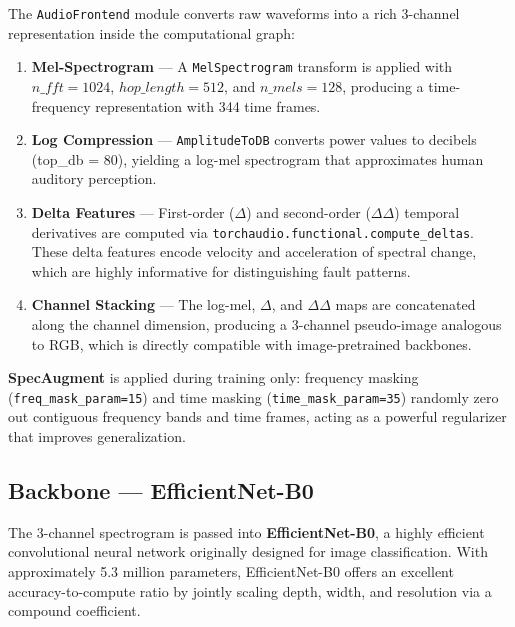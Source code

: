 \documentclass[12pt,a4paper]{article}
\begin{document}
The \texttt{AudioFrontend} module converts raw waveforms into a rich 3-channel representation inside the computational graph:

\begin{enumerate}[leftmargin=2em]
  \item \textbf{Mel-Spectrogram} — A \texttt{MelSpectrogram} transform is applied with $n\_fft = 1024$, $hop\_length = 512$, and $n\_mels = 128$, producing a time-frequency representation with 344 time frames.
  \item \textbf{Log Compression} — \texttt{AmplitudeToDB} converts power values to decibels (top\_db = 80), yielding a log-mel spectrogram that approximates human auditory perception.
  \item \textbf{Delta Features} — First-order ($\Delta$) and second-order ($\Delta\Delta$) temporal derivatives are computed via \texttt{torchaudio.functional.compute\_deltas}. These delta features encode velocity and acceleration of spectral change, which are highly informative for distinguishing fault patterns.
  \item \textbf{Channel Stacking} — The log-mel, $\Delta$, and $\Delta\Delta$ maps are concatenated along the channel dimension, producing a 3-channel pseudo-image analogous to RGB, which is directly compatible with image-pretrained backbones.
\end{enumerate}

\textbf{SpecAugment} is applied during training only: frequency masking (\texttt{freq\_mask\_param=15}) and time masking (\texttt{time\_mask\_param=35}) randomly zero out contiguous frequency bands and time frames, acting as a powerful regularizer that improves generalization.

\subsection{Backbone — EfficientNet-B0}

The 3-channel spectrogram is passed into \textbf{EfficientNet-B0}, a highly efficient convolutional neural network originally designed for image classification. With approximately 5.3 million parameters, EfficientNet-B0 offers an excellent accuracy-to-compute ratio by jointly scaling depth, width, and resolution via a compound coefficient.
\end{document}
